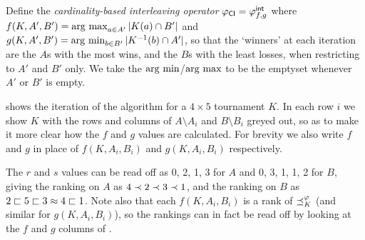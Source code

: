 \begin{example}
    \label{tourn_ex_cardint}

    Define the \emph{cardinality-based interleaving operator} ${\varphi_{\mathsf{CI}}} =
    {\varphi_{f,g}^\mathsf{int}}$ where $f(K, A', B') = \operatorname*{arg\ max}_{a \in A'}{|K(a) \cap B'|}$ and
    \\  %
    $g(K, A', B') = \operatorname*{arg\ min}_{b \in B'}{|K^{-1}(b) \cap A'|}$, so that the
    `winners' at each iteration are the $A$s with the most wins, and the $B$s
    with the least losses, when restricting to $A'$ and $B'$ only.  We take the
    $\operatorname*{arg\ min}$/$\operatorname*{arg\ max}$ to be the emptyset whenever $A'$ or $B'$ is empty.

     shows the iteration of the algorithm for a $4
    \times 5$ tournament $K$. In each row $i$ we show $K$ with the rows and
    columns of $A \setminus A_i$ and $B \setminus B_i$ greyed out, so as to
    make it more clear how the $f$ and $g$ values are
    calculated.\footnotemark{} For brevity we also write $f$ and $g$ in place
    of $f(K, A_i, B_i)$ and $g(K, A_i, B_i)$ respectively.

    The $r$ and $s$ values can be read off as 0, 2, 1, 3 for $A$ and 0, 3, 1,
    1, 2 for $B$, giving the ranking on $A$ as $4 \prec 2 \prec 3 \prec 1$, and
    the ranking on $B$ as $2 \sqsubset 5 \sqsubset 3 \approx 4 \sqsubset 1$. Note also that each
    $f(K, A_i, B_i)$ is a rank of $\preceq_K^\varphi$ (and similar for $g(K, A_i,
    B_i)$), so the rankings can in fact be read off by looking at the $f$ and
    $g$ columns of .


\end{example}

